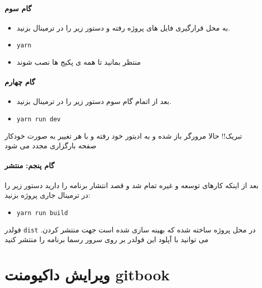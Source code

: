 \documentclass[]{article}
\providecommand{\tightlist}{%
  \setlength{\itemsep}{0pt}\setlength{\parskip}{0pt}}
\let\oldparagraph\paragraph
\renewcommand{\paragraph}[1]{\oldparagraph{#1}\mbox{}}
\begin{document}
\paragraph{گام سوم}\label{ux6afux627ux645-ux633ux648ux645}

\begin{itemize}
\tightlist
\item
  به محل قرارگیری فایل های پروژه رفته و دستور زیر را در ترمینال بزنید.
\item
  \texttt{yarn}
\item
  منتظر بمانید تا همه ی پکیج ها نصب شوند
\end{itemize}

\paragraph{گام چهارم}\label{ux6afux627ux645-ux686ux647ux627ux631ux645}

\begin{itemize}
\tightlist
\item
  بعد از اتمام گام سوم دستور زیر را در ترمینال بزنید.
\item
  \texttt{yarn\ run\ dev}
\end{itemize}

تبریک!! حالا مرورگر باز شده و به ادیتور خود رفته و با هر تغییر به صورت
خودکار صفحه بارگزاری مجدد می شود

\paragraph{گام پنجم:
منتشر}\label{ux6afux627ux645-ux67eux646ux62cux645-ux645ux646ux62aux634ux631}

بعد از اینکه کارهای توسعه و غیره تمام شد و قصد انتشار برنامه را دارید
دستور زیر را در ترمینال جاری پروژه بزنید:

\begin{itemize}
\tightlist
\item
  \texttt{yarn\ run\ build}
\end{itemize}

فولدر ‍\texttt{dist} در محل پروژه ساخته شده که بهینه سازی شده است جهت
منتشر کردن. می توانید با آپلود این فولدر بر روی سرور رسما برنامه را
منتشر کنید

\section{ویرایش داکیومنت
gitbook}\label{ux648ux6ccux631ux627ux6ccux634-ux62fux627ux6a9ux6ccux648ux645ux646ux62a-gitbook}
\end{document}
